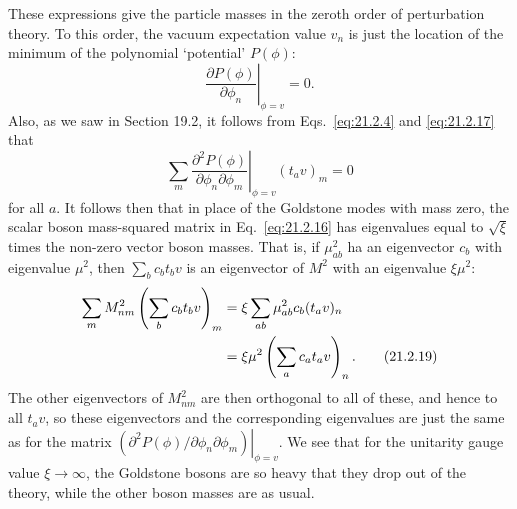 These expressions give the particle masses in the zeroth order of
perturbation theory. To this order, the vacuum expectation value $v_n$ is
just the location of the minimum of the polynomial `potential' $P(\phi)$:
\begin{equation}
 \left.\frac{\partial P(\phi)}{\partial\phi_n}\right|_{\phi=v}=0.
 \tag{21.2.17}\label{eq:21.2.17}
\end{equation}
Also, as we saw in Section 19.2, it follows from Eqs.~\eqref{eq:21.2.4} and
\eqref{eq:21.2.17} that
\begin{equation}
 \sum_m\left.
 \frac{\partial^2P(\phi)}{\partial\phi_n\partial\phi_m}
 \right|_{\phi=v}(t_a v)_m=0
 \tag{21.2.18}\label{eq:21.2.18}
\end{equation}
for all $a$. It follows then that in place of the Goldstone modes with
mass zero, the scalar boson mass-squared matrix in Eq.~\eqref{eq:21.2.16}
has eigenvalues equal to $\sqrt{\xi}$ times the non-zero vector boson
masses. That is, if $\mu^2_{ab}$ ha an eigenvector $c_b$ with
eigenvalue $\mu^2$, then $\sum_b c_b t_b v$ is an eigenvector
of $M^2$ with an eigenvalue $\xi\mu^2$:
\begin{align}
 \sum_mM^2_{nm}
 \left(\sum_b c_b t_b v\right)_m
 &=
 \xi\sum_{ab}\mu^2_{ab}c_b
 (t_a v)_n
 \notag\\
 &=\xi\mu^2
 \left(\sum_a c_a t_a v\right)_n.
 \tag{21.2.19}\label{eq:21.2.19}
\end{align}
The other eigenvectors of $M^2_{nm}$ are then orthogonal to all of these,
and hence to all $t_a v$, so these eigenvectors and the corresponding
eigenvalues are just the same as for the matrix
$\left.(\partial^2P(\phi)/\partial\phi_n\partial\phi_m)\right|_{\phi=v}$.
We see that for the unitarity gauge value $\xi\to\infty$, the Goldstone
bosons are so heavy that they drop out of the theory, while the other boson
masses are as usual.

